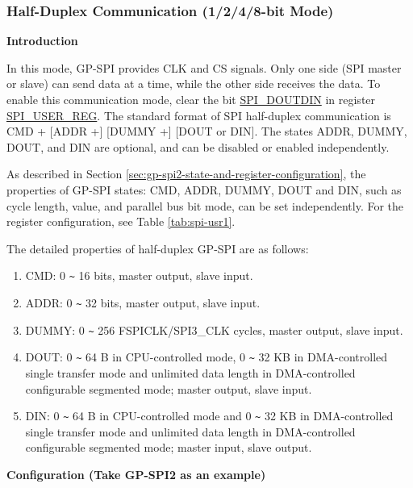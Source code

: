 \documentclass[main\_\_EN.tex]{subfiles}
\begin{document}
\subsubsection{Half-Duplex Communication (1/2/4/8-bit Mode)}
\label{sec:gp-spi2-1/2/8-bits}
\textbf{Introduction}

In this mode, GP-SPI provides CLK and CS signals. Only one side (SPI master or slave) can send data at a time, while the other side receives the data. To enable this communication mode, clear the bit \hyperref[fielddesc:SPIDOUTDIN]{SPI\_DOUTDIN} in register \hyperref[regdesc:SPIUSERREG]{SPI\_USER\_REG}. The standard format of SPI half-duplex communication is CMD + [ADDR +] [DUMMY +] [DOUT or DIN]. The states ADDR, DUMMY, DOUT, and DIN are optional, and can be disabled or enabled independently.

As described in Section \ref{sec:gp-spi2-state-and-register-configuration}, the properties of GP-SPI states: CMD, ADDR, DUMMY, DOUT and DIN, such as cycle length, value, and parallel bus bit mode, can be set independently. For the register configuration, see Table \ref{tab:spi-usr1}.

The detailed properties of half-duplex GP-SPI are as follows:

\begin{enumerate}
    \item CMD: 0 \verb+~+ 16 bits, master output, slave input.
    \item ADDR: 0 \verb+~+ 32 bits, master output, slave input.
    \item DUMMY: 0 \verb+~+ 256 FSPICLK/SPI3\_CLK cycles, master output, slave input.
    \item DOUT: 0 \verb+~+ 64 B in CPU-controlled mode, 0 \verb+~+ 32 KB in DMA-controlled single transfer mode and unlimited data length in DMA-controlled configurable segmented mode; master output, slave input.

    \item DIN: 0 \verb+~+ 64 B in CPU-controlled mode and 0 \verb+~+ 32 KB in DMA-controlled single transfer mode and unlimited data length in DMA-controlled configurable segmented mode; master input, slave output.
\end{enumerate}

\textbf{Configuration (Take GP-SPI2 as an example)}
\end{document}
